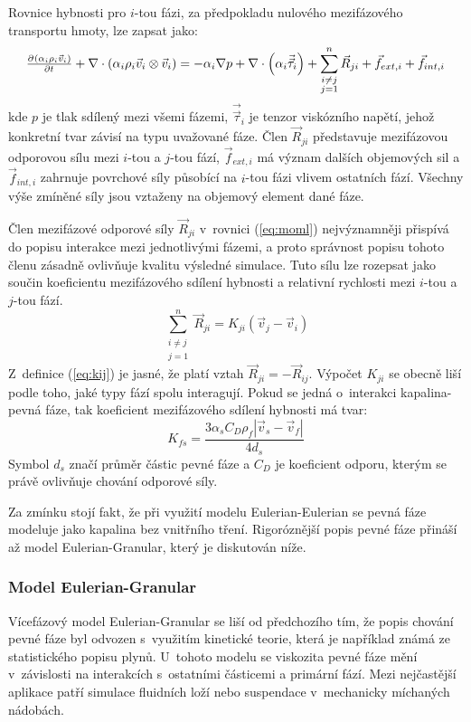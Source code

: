 Rovnice hybnosti pro $i$-tou fázi, za předpokladu nulového mezifázového transportu hmoty, lze zapsat jako:
\begin{equation}
	\pd{\kula{\alpha_{i}\rho_{i}\vec{v}_{i}}}{t} + \nabla \cdot \kula{\alpha_{i}\rho_{i} \vec{v}_{i} \otimes \vec{v}_{i}} = -\alpha_{i} \nabla p + \nabla \cdot \left(\alpha_{i} \vec{\vec{\tau}}_{i} \right) +\sum_{\substack{ i \neq j \\ j=1}}^{n} \vec{R}_{ji} + \vec{f}_{ext,i} + \vec{f}_{int,i}
	\label{eq:moml}
\end{equation}
\noindent kde $p$ je tlak sdílený mezi všemi fázemi, $\vec{\vec{\tau}}_{i}$ je tenzor viskózního napětí, jehož konkretní tvar závisí na typu uvažované fáze. Člen $\vec{R}_{ji}$ představuje mezifázovou odporovou sílu mezi $i$-tou a $j$-tou fází, $\vec{f}_{ext,i}$ má význam dalších objemových sil a $\vec{f}_{int,i}$ zahrnuje povrchové síly působící na $i$-tou fázi vlivem ostatních fází. Všechny výše zmíněné síly jsou vztaženy na objemový element dané fáze. 

Člen mezifázové odporové síly $\vec{R}_{ji}$ v~rovnici (\ref{eq:moml}) nejvýznamněji přispívá do popisu interakce mezi jednotlivými fázemi, a proto správnost popisu tohoto členu zásadně ovlivňuje kvalitu výsledné simulace. Tuto sílu lze rozepsat jako součin koeficientu mezifázového sdílení hybnosti a relativní rychlosti mezi $i$-tou a $j$-tou fází.
\begin{equation}
	 \sum_{\substack{ i \neq j \\ j=1}}^{n} \vec{R}_{ji} = K_{ji} \left( \vec{v}_{j} - \vec{v}_{i} \right)
	\label{eq:kij}
\end{equation}
Z~definice (\ref{eq:kij}) je jasné, že platí vztah $\vec{R}_{ji} = -\vec{R}_{ij}$. Výpočet $K_{ji}$ se obecně liší podle toho, jaké typy fází spolu interagují. Pokud se jedná o~interakci kapalina-pevná fáze, tak koeficient mezifázového sdílení hybnosti má tvar:
\begin{equation}
	K_{fs}= \frac{3\alpha_{s}C_{D}\rho_{f}\left|\vec{v}_{s} - \vec{v}_{f}\right|}{4d_{s}}
	\label{eq:kfs}
\end{equation}
Symbol $d_{s}$ značí průměr částic pevné fáze a $C_{D}$ je koeficient odporu, kterým se právě ovlivňuje chování odporové síly. 
 
Za zmínku stojí fakt, že při využití modelu Eulerian-Eulerian se pevná fáze modeluje jako kapalina bez vnitřního tření. Rigoróznější popis pevné fáze přináší až model Eulerian-Granular, který je diskutován níže. 

\subsubsection{Model Eulerian-Granular}
\label{sec:egm}
Vícefázový model Eulerian-Granular se liší od předchozího tím, že  popis chování pevné fáze byl odvozen s~využitím kinetické teorie, která je například známá ze statistického popisu plynů. U~tohoto modelu se viskozita pevné fáze mění v~závislosti na interakcích s~ostatními částicemi a primární fází. Mezi nejčastější aplikace patří simulace fluidních loží nebo suspendace v~mechanicky míchaných nádobách.

